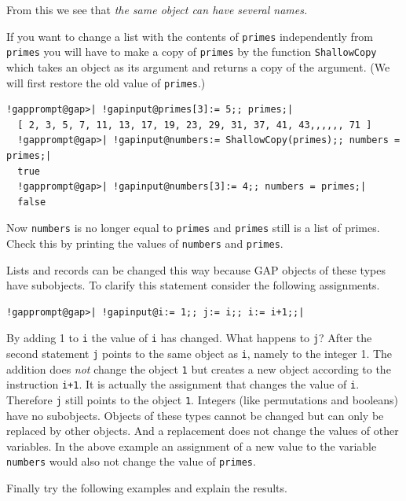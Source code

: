 \documentclass[a4paper,11pt]{report}
\begin{document}
{{ From this we see that \emph{the same object can have several names.} 

 If you want to change a list with the contents of \texttt{primes} independently from \texttt{primes} you will have to make a copy of \texttt{primes} by the function \texttt{ShallowCopy} which takes an object as its argument and returns a copy of the argument. (We
will first restore the old value of \texttt{primes}.) 

 
\begin{Verbatim}[commandchars=!@|,fontsize=\small,frame=single,label=Example]
  !gapprompt@gap>| !gapinput@primes[3]:= 5;; primes;|
  [ 2, 3, 5, 7, 11, 13, 17, 19, 23, 29, 31, 37, 41, 43,,,,,, 71 ]
  !gapprompt@gap>| !gapinput@numbers:= ShallowCopy(primes);; numbers = primes;|
  true
  !gapprompt@gap>| !gapinput@numbers[3]:= 4;; numbers = primes;|
  false
\end{Verbatim}
 

 Now \texttt{numbers} is no longer equal to \texttt{primes} and \texttt{primes} still is a list of primes. Check this by printing the values of \texttt{numbers} and \texttt{primes}. 

 Lists and records can be changed this way because \textsf{GAP} objects of these types have subobjects. To clarify this statement consider the
following assignments. 

 
\begin{Verbatim}[commandchars=!@|,fontsize=\small,frame=single,label=Example]
  !gapprompt@gap>| !gapinput@i:= 1;; j:= i;; i:= i+1;;|
\end{Verbatim}
 

 By adding 1 to \texttt{i} the value of \texttt{i} has changed. What happens to \texttt{j}? After the second statement \texttt{j} points to the same object as \texttt{i}, namely to the integer 1. The addition does \emph{not} change the object \texttt{1} but creates a new object according to the instruction \texttt{i+1}. It is actually the assignment that changes the value of \texttt{i}. Therefore \texttt{j} still points to the object \texttt{1}. Integers (like permutations and booleans) have no subobjects. Objects of
these types cannot be changed but can only be replaced by other objects. And a
replacement does not change the values of other variables. In the above
example an assignment of a new value to the variable \texttt{numbers} would also not change the value of \texttt{primes}. 

 Finally try the following examples and explain the results. 

}}
\end{document}
